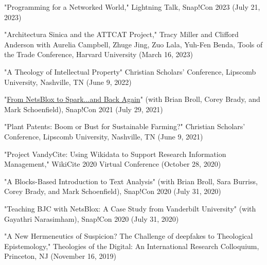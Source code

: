 \documentclass[]{res} %
\begin{document}
\begin{resume}
\begin{hangparas}{.25in}{1}"Programming for a Networked World," Lightning Talk, Snap!Con 2023 (July 21, 2023)\end{hangparas}

\begin{hangparas}{.25in}{1}"Architectura Sinica and the ATTCAT Project," Tracy Miller and Clifford Anderson with Aurelia Campbell, Zhuge Jing, Zuo Lala, Yuh-Fen Benda, Tools of the Trade Conference, Harvard University (March 16, 2023)\end{hangparas}

\begin{hangparas}{.25in}{1}"A Theology of Intellectual Property" Christian Scholars’ Conference, Lipscomb University, Nashville, TN (June 9, 2022)\end{hangparas}

\begin{hangparas}{.25in}{1}"\href{https://medium.com/the-faculty/from-netsblox-to-spark-and-back-again-b6da21bd79b6}{From NetsBlox to Spark...and Back Again}" (with Brian Broll, Corey Brady, and Mark Schoenfield), Snap!Con 2021 (July 29, 2021)\end{hangparas}

\begin{hangparas}{.25in}{1}"Plant Patents: Boom or Bust for Sustainable Farming?" Christian Scholars’ Conference, Lipscomb University, Nashville, TN (June 9, 2021)\end{hangparas}

\begin{hangparas}{.25in}{1}"Project VandyCite: Using Wikidata to Support Research Information Management," WikiCite 2020 Virtual Conference (October 28, 2020)\end{hangparas}

\begin{hangparas}{.25in}{1}"A Blocks-Based Introduction to Text Analysis" (with Brian Broll, Sara Burriss, Corey Brady, and Mark Schoenfield), Snap!Con 2020 (July 31, 2020)\end{hangparas}

\begin{hangparas}{.25in}{1}"Teaching BJC with NetsBlox: A Case Study from Vanderbilt University" (with Gayathri Narasimham), Snap!Con 2020 (July 31, 2020)\end{hangparas}

\begin{hangparas}{.25in}{1}"A New Hermeneutics of Suspicion? The Challenge of deepfakes to Theological Epistemology," Theologies of the Digital: An International Research Colloquium, Princeton, NJ (November 16, 2019)\end{hangparas}


\end{resume}
\end{document}
